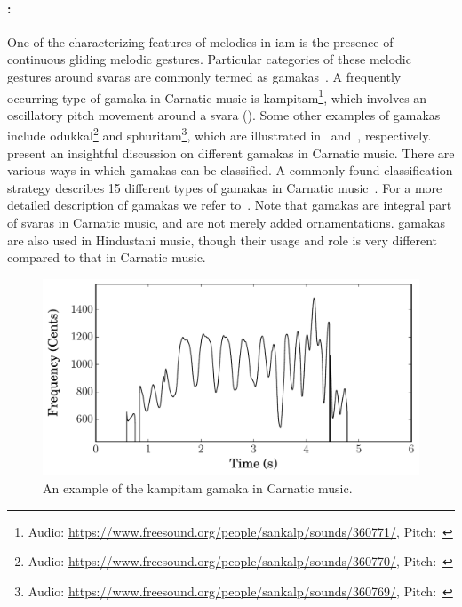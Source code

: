 \paragraph{:} One of the characterizing features of melodies in \gls{iam} is the presence of continuous gliding melodic gestures. Particular categories of these melodic gestures around \glspl{svara} are commonly termed as \glspl{gamaka}~\citep{krishna2012carnatic}. A frequently occurring type of \gls{gamaka} in Carnatic music is \gls{kampitam}\footnote{Audio: \url{https://www.freesound.org/people/sankalp/sounds/360771/}, Pitch:~}, which involves an oscillatory pitch movement around a \gls{svara} (). Some other examples of \glspl{gamaka} include \gls{odukkal}\footnote{Audio: \url{https://www.freesound.org/people/sankalp/sounds/360770/}, Pitch:~} and \gls{sphuritam}\footnote{Audio: \url{https://www.freesound.org/people/sankalp/sounds/360769/}, Pitch:~}, which are illustrated in~ and~, respectively. \cite{krishna2012carnatic} present an insightful discussion on different \glspl{gamaka} in Carnatic music. There are various ways in which \glspl{gamaka} can be classified. A commonly found classification strategy describes 15 different types of \glspl{gamaka} in Carnatic music~\citep{ramanathan1999musical,janakiraman2008essentials,narayanswami2011}. For a more detailed description of \glspl{gamaka} we refer to~\cite{narayanswami2011}. Note that \glspl{gamaka} are integral part of \glspl{svara} in Carnatic music, and are not merely added ornamentations. \Glspl{gamaka} are also used in Hindustani music, though their usage and role is very different compared to that in Carnatic music. 


\begin{figure}
	\begin{center}
		\includegraphics[width=\figSizeEighty]{ch02_background/figures/Kampitam_on_N2_Todi.pdf}
	\end{center}
	\caption[An example of the \gls{kampitam} \gls{gamaka} in Carnatic music]{An example of the \gls{kampitam} \gls{gamaka} in Carnatic music.}
	\label{fig:kampita_todi}
\end{figure}


